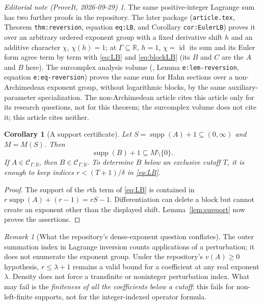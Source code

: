 \documentclass[11pt,a4paper]{article}
\newtheorem{corollary}[theorem]{Corollary}
\theoremstyle{definition}
\theoremstyle{remark}
\newtheorem{remark}[theorem]{Remark}
\newtheorem*{ednote}{Editorial note (ProveIt, 2026-09-29)}
\newcommand{\R}{\mathbb R}
\newcommand{\Clf}{\mathcal C_{\Gamma,\mathrm{lf}}}
\newcommand{\supp}{\operatorname{supp}}
\newcommand{\id}{\operatorname{id}}
\begin{document}
\begin{ednote}\label{ed:lb-other-proofs}
The same positive-integer Lagrange sum has two further proofs in the
repository. The later package
(\texttt{article.tex}, Theorem \texttt{thm:reversion}, equation
\texttt{eq:LB}, and Corollary \texttt{cor:EulerLB}) proves it over an
arbitrary ordered exponent group with a fixed derivative shift $h$ and an
additive character $\chi$, $\chi(h)=1$; at $\Gamma\subseteq\R$, $h=1$,
$\chi=\id$ its sum and its Euler form agree term by term with
\eqref{eq:LB} and \eqref{eq:blockLB} (its $B$ and $C$ are the $A$ and $B$
here). The surcomplex analysis volume
(,
Lemma \texttt{e:lem-reversion}, equation \texttt{e:eq-reversion}) proves
the same sum for Hahn sections over a non-Archimedean exponent group,
without logarithmic blocks, by the same auxiliary-parameter specialization.
The non-Archimedean article cites this article only for its research
questions, not for this theorem; the surcomplex volume does not cite it;
this article cites neither.
\end{ednote}

\begin{corollary}[A support certificate]\label{cor:monoid}
Let $S=\supp(A)+1\subseteq(0,\infty)$ and $M=M(S)$. Then
\begin{equation}\label{eq:Bsupp}
 \supp(B)+1\subseteq M\setminus\{0\}.
\end{equation}
If $A\in\Clf$, then $B\in\Clf$. To determine $B$ below an exclusive cutoff
$T$, it is enough to keep indices
$r<(T+1)/\delta$ in \eqref{eq:LB}.
\end{corollary}
\begin{proof}
The support of the $r$th term of \eqref{eq:LB} is contained in
$r\supp(A)+(r-1)=rS-1$. Differentiation can delete a block but cannot create
an exponent other than the displayed shift. Lemma~\ref{lem:support} now
proves the assertions.
\end{proof}

\begin{remark}[What the repository's dense-exponent question conflates]
The outer summation index in Lagrange inversion counts applications of a
perturbation; it does not enumerate the exponent group. Under the
repository's $v(A)\ge0$ hypothesis, $r\le\lambda+1$ remains a valid bound
for a coefficient at any real exponent $\lambda$. Density does not force a
transfinite or noninteger perturbation index. What may fail is the
\emph{finiteness of all the coefficients below a cutoff}: this fails for
non-left-finite supports, not for the integer-indexed operator formula.
\end{remark}
\end{document}
